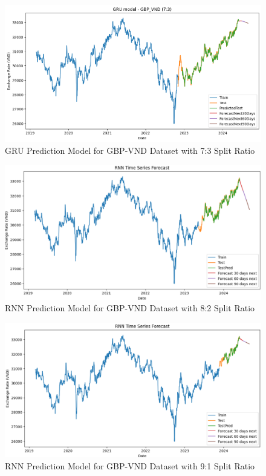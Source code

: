 \documentclass{ieeeojies}
\begin{document}
\begin{figure}[H]
  \centering
  \begin{minipage}{0.8\linewidth}
    \centering
    \includegraphics[width=\linewidth]{GRU/GRU_gbp_73.png}
    \caption{GRU Prediction Model for GBP-VND Dataset with 7:3 Split Ratio}
    \label{fig29}
  \end{minipage}
\end{figure}
\begin{figure}[H]
  \centering
  \begin{minipage}{0.8\linewidth}
    \centering
    \includegraphics[width=\linewidth]{RNN/rnn_gbp_82.png}
    \caption{RNN Prediction Model for GBP-VND Dataset with 8:2 Split Ratio}
    \label{fig30}
  \end{minipage}
\end{figure}
\begin{figure}[H]
  \centering
  \begin{minipage}{0.8\linewidth}
    \centering
    \includegraphics[width=\linewidth]{RNN/rnn_gbp_91.png}
    \caption{RNN Prediction Model for GBP-VND Dataset with 9:1 Split Ratio}
    \label{fig31}
  \end{minipage}
\end{figure}
\end{document}
